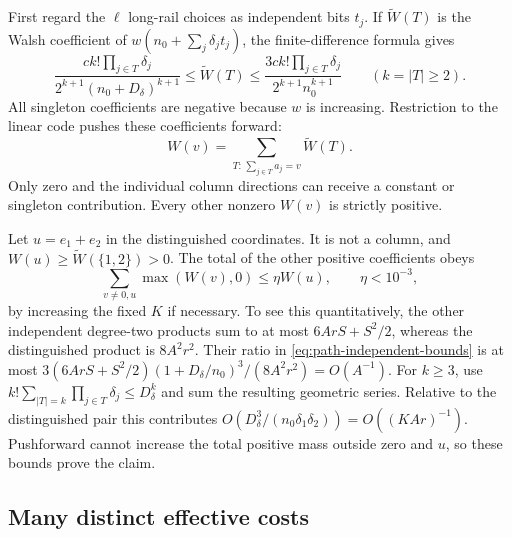 First regard the $\ell$ long-rail choices as independent bits $t_j$.
If $\widetilde W(T)$ is the Walsh coefficient of
$w(n_0+\sum_j\delta_jt_j)$, the finite-difference formula gives
\begin{equation}\label{eq:path-independent-bounds}
 \frac{ck!\prod_{j\in T}\delta_j}
      {2^{k+1}(n_0+D_\delta)^{k+1}}
 \le\widetilde W(T)\le
 \frac{3ck!\prod_{j\in T}\delta_j}{2^{k+1}n_0^{k+1}}
 \qquad(k=|T|\ge2).
\end{equation}
All singleton coefficients are negative because $w$ is increasing.
Restriction to the linear code pushes these coefficients forward:
\begin{equation}\label{eq:path-pushforward}
 W(v)=\sum_{T:\,\sum_{j\in T}a_j=v}\widetilde W(T).
\end{equation}
Only zero and the individual column directions can receive a
constant or singleton contribution. Every other nonzero $W(v)$ is
strictly positive.

Let $u=e_1+e_2$ in the distinguished coordinates. It is not a column,
and $W(u)\ge\widetilde W(\{1,2\})>0$. The total of the other
positive coefficients obeys
\begin{equation}\label{eq:path-dominance}
 \sum_{v\ne0,u}\max(W(v),0)\le\eta W(u),\qquad \eta<10^{-3},
\end{equation}
by increasing the fixed $K$ if necessary. To see this quantitatively,
the other independent degree-two products sum to at most
$6ArS+S^2/2$, whereas the distinguished product is $8A^2r^2$.
Their ratio in \eqref{eq:path-independent-bounds} is at most
$3(6ArS+S^2/2)(1+D_\delta/n_0)^3/(8A^2r^2)=O(A^{-1})$.
For $k\ge3$, use
$k!\sum_{|T|=k}\prod_{j\in T}\delta_j\le D_\delta^k$ and sum
the resulting geometric series. Relative to the distinguished pair
this contributes $O(D_\delta^3/(n_0\delta_1\delta_2))
=O((KAr)^{-1})$. Pushforward cannot increase the total positive mass
outside zero and $u$, so these bounds prove the claim.

\subsection{Many distinct effective costs}

